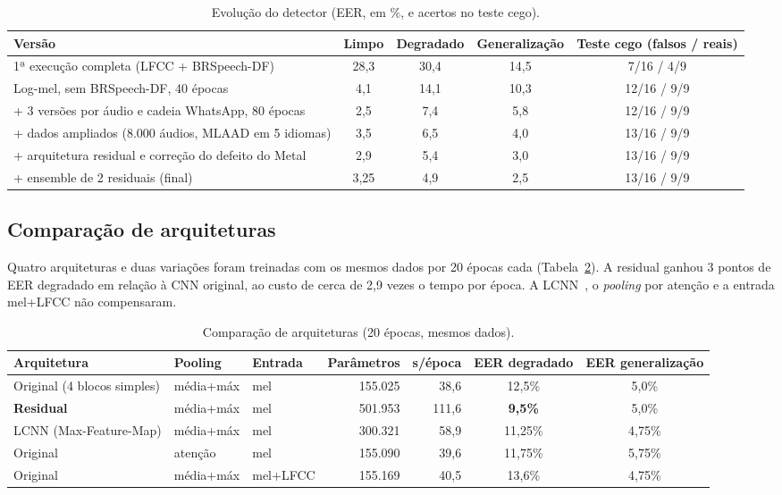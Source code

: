 \begin{table}[!ht]
\caption{Evolução do detector (EER, em \%, e acertos no teste cego).}
\centering
\small
\begin{tabular}{@{}p{7.2cm}cccc@{}}
\hline\hline
Versão & Limpo & Degradado & Generalização & Teste cego (falsos / reais) \\
\hline
1ª execução completa (LFCC + BRSpeech-DF) & 28,3 & 30,4 & 14,5 & 7/16 / 4/9 \\
Log-mel, sem BRSpeech-DF, 40 épocas & 4,1 & 14,1 & 10,3 & 12/16 / 9/9 \\
+ 3 versões por áudio e cadeia WhatsApp, 80 épocas & 2,5 & 7,4 & 5,8 & 12/16 / 9/9 \\
+ dados ampliados (8.000 áudios, MLAAD em 5 idiomas) & 3,5 & 6,5 & 4,0 & 13/16 / 9/9 \\
+ arquitetura residual e correção do defeito do Metal & 2,9 & 5,4 & 3,0 & 13/16 / 9/9 \\
+ ensemble de 2 residuais (final) & 3,25 & 4,9 & 2,5 & 13/16 / 9/9 \\
\hline\hline
\end{tabular}
\label{tab:evolucao}
\end{table}

\subsection{Comparação de arquiteturas}

Quatro arquiteturas e duas variações foram treinadas com os mesmos dados por 20 épocas cada (Tabela~\ref{tab:arquiteturas}). A residual ganhou 3 pontos de EER degradado em relação à CNN original, ao custo de cerca de 2,9 vezes o tempo por época. A LCNN~\citep{lavrentyev2019stc}, o \textit{pooling} por atenção e a entrada mel+LFCC não compensaram.

\begin{table}[!ht]
\caption{Comparação de arquiteturas (20 épocas, mesmos dados).}
\centering
\small
\begin{tabular}{@{}lllrrcc@{}}
\hline\hline
Arquitetura & Pooling & Entrada & Parâmetros & s/época & EER degradado & EER generalização \\
\hline
Original (4 blocos simples) & média+máx & mel & 155.025 & 38,6 & 12,5\% & 5,0\% \\
\textbf{Residual} & média+máx & mel & 501.953 & 111,6 & \textbf{9,5\%} & 5,0\% \\
LCNN (Max-Feature-Map) & média+máx & mel & 300.321 & 58,9 & 11,25\% & 4,75\% \\
Original & atenção & mel & 155.090 & 39,6 & 11,75\% & 5,75\% \\
Original & média+máx & mel+LFCC & 155.169 & 40,5 & 13,6\% & 4,75\% \\
\hline\hline
\end{tabular}
\label{tab:arquiteturas}
\end{table}


